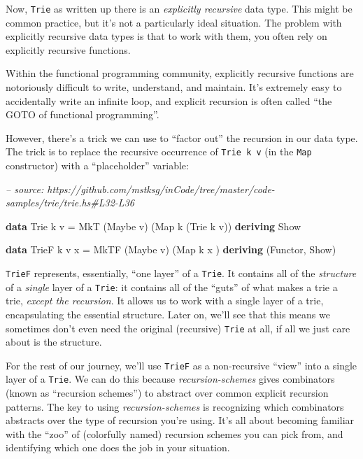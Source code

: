 \documentclass[]{article}
\newenvironment{Shaded}{}{}
\newcommand{\CommentTok}[1]{\textcolor[rgb]{0.38,0.63,0.69}{\textit{#1}}}
\newcommand{\DataTypeTok}[1]{\textcolor[rgb]{0.56,0.13,0.00}{#1}}
\newcommand{\FunctionTok}[1]{\textcolor[rgb]{0.02,0.16,0.49}{#1}}
\newcommand{\KeywordTok}[1]{\textcolor[rgb]{0.00,0.44,0.13}{\textbf{#1}}}
\newcommand{\NormalTok}[1]{#1}
\begin{document}
Now, \texttt{Trie} as written up there is an \emph{explicitly recursive} data
type. This might be common practice, but it's not a particularly ideal
situation. The problem with explicitly recursive data types is that to work with
them, you often rely on explicitly recursive functions.

Within the functional programming community, explicitly recursive functions are
notoriously difficult to write, understand, and maintain. It's extremely easy to
accidentally write an infinite loop, and explicit recursion is often called
``the GOTO of functional programming''.

However, there's a trick we can use to ``factor out'' the recursion in our data
type. The trick is to replace the recursive occurrence of \texttt{Trie\ k\ v}
(in the \texttt{Map} constructor) with a ``placeholder'' variable:

\begin{Shaded}
\begin{Highlighting}[]
\CommentTok{-- source: https://github.com/mstksg/inCode/tree/master/code-samples/trie/trie.hs#L32-L36}

\KeywordTok{data} \DataTypeTok{Trie}\NormalTok{  k v   }\FunctionTok{=} \DataTypeTok{MkT}\NormalTok{  (}\DataTypeTok{Maybe}\NormalTok{ v) (}\DataTypeTok{Map}\NormalTok{ k (}\DataTypeTok{Trie}\NormalTok{ k v))}
  \KeywordTok{deriving} \DataTypeTok{Show}

\KeywordTok{data} \DataTypeTok{TrieF}\NormalTok{ k v x }\FunctionTok{=} \DataTypeTok{MkTF}\NormalTok{ (}\DataTypeTok{Maybe}\NormalTok{ v) (}\DataTypeTok{Map}\NormalTok{ k x         )}
  \KeywordTok{deriving}\NormalTok{ (}\DataTypeTok{Functor}\NormalTok{, }\DataTypeTok{Show}\NormalTok{)}
\end{Highlighting}
\end{Shaded}

\texttt{TrieF} represents, essentially, ``one layer'' of a \texttt{Trie}. It
contains all of the \emph{structure} of a \emph{single} layer of a
\texttt{Trie}: it contains all of the ``guts'' of what makes a trie a trie,
\emph{except the recursion}. It allows us to work with a single layer of a trie,
encapsulating the essential structure. Later on, we'll see that this means we
sometimes don't even need the original (recursive) \texttt{Trie} at all, if all
we just care about is the structure.

For the rest of our journey, we'll use \texttt{TrieF} as a non-recursive
``view'' into a single layer of a \texttt{Trie}. We can do this because
\emph{recursion-schemes} gives combinators (known as ``recursion schemes'') to
abstract over common explicit recursion patterns. The key to using
\emph{recursion-schemes} is recognizing which combinators abstracts over the
type of recursion you're using. It's all about becoming familiar with the
``zoo'' of (colorfully named) recursion schemes you can pick from, and
identifying which one does the job in your situation.
\end{document}
